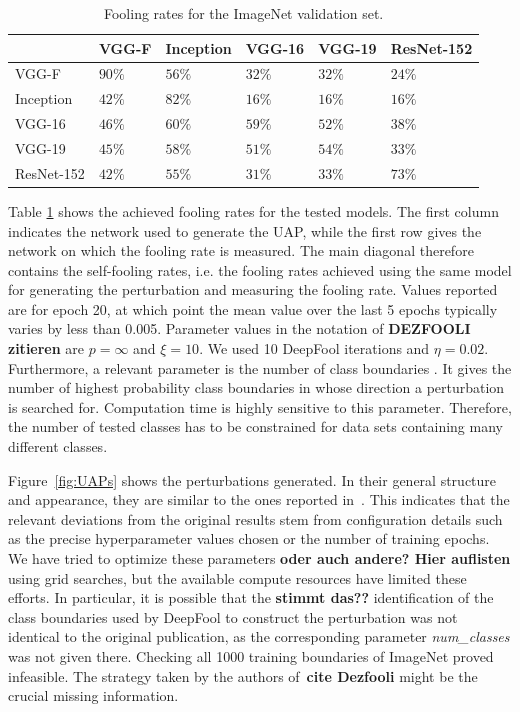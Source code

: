 \documentclass[runningheads]{llncs}
\begin{document}
\begin{table}[]
\centering
\caption{Fooling rates for the ImageNet validation set.}
\begin{tabular}{|l|l|l|l|l|l|}
\hline

			& VGG-F		&	Inception	&	VGG-16		&	VGG-19		&	ResNet-152	\\ \hline
VGG-F		& $90\%$	&	$56\%$		&	$32\%$		&	$32\%$		& 	$24\%$		\\
Inception	& $42\%$	&	$82\%$		&	$16\%$		&	$16\%$		& 	$16\%$	\\
VGG-16		& $46\%$	&	$60\%$		&	$59\%$		&	$52\%$		& 	$38\%$	\\
VGG-19		& $45\%$	&	$58\%$		&	$51\%$		&	$54\%$		& 	$33\%$	\\
ResNet-152	& $42\%$	&	$55\%$		&	$31\%$		&	$33\%$		& 	$73\%$	\\
\hline 
\end{tabular}
\label{tbl_stoerraten_reprod_kreuz_linf}
\end{table}

Table \ref{tbl_stoerraten_reprod_kreuz_linf} shows the achieved fooling rates for the tested models. The first column indicates the network used to generate the UAP, while the first row gives the network on which the fooling rate is measured. 
The main diagonal therefore contains the self-fooling rates, i.e. the fooling rates achieved using the same model for generating the perturbation and measuring the fooling rate. Values reported are for epoch 20, at which point the mean value over the last 5 epochs typically varies by less than 0.005. Parameter values in the notation of {\bf DEZFOOLI zitieren} are \(p=\infty\) and \(\xi=10\). We used 10 DeepFool iterations and \(\eta=0.02\). Furthermore, a relevant parameter is the number of class boundaries
. It gives the number of highest probability class boundaries in whose direction a perturbation is searched for. Computation time is highly sensitive to this parameter. Therefore, the number of tested classes has to be constrained for data sets containing many different classes.

Figure~\ref{fig:UAPs} shows the perturbations generated. In their general structure and appearance, they are similar to the ones reported in~\cite{moosavi-dezfooli_universal_2017-1}. This indicates that the relevant deviations from the original results stem from configuration details such as the precise hyperparameter values chosen or the number of training epochs. We have tried to optimize these parameters {\bf oder auch andere? Hier auflisten} using grid searches, but the available compute resources have limited these efforts. In particular, it is possible that the {\bf stimmt das??} identification of the class boundaries used by DeepFool to construct the perturbation was not identical to the original publication, as the corresponding parameter {\sl num\_classes} was not given there. Checking all 1000 training boundaries of ImageNet proved infeasible. The strategy taken by the authors of~{\bf cite Dezfooli} might be the crucial missing information.
 
\end{document}
